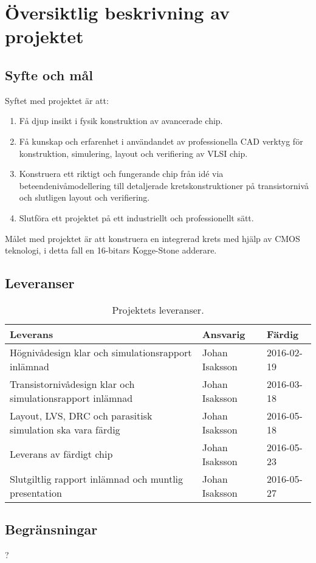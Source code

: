\section{Översiktlig beskrivning av projektet}


\subsection{Syfte och mål}
Syftet med projektet är att:
\begin{enumerate}
 \item Få djup insikt i fysik konstruktion av avancerade chip.
 \item Få kunskap och erfarenhet i användandet av professionella CAD verktyg för konstruktion, simulering, layout och verifiering av VLSI chip.
 \item Konstruera ett riktigt och fungerande chip från idé via beteendenivåmodellering till detaljerade kretskonstruktioner på transistornivå och slutligen layout och verifiering.
 \item Slutföra ett projektet på ett industriellt och professionellt sätt.
\end{enumerate}

\raggedright Målet med projektet är att konstruera en integrerad krets med hjälp av CMOS teknologi, i detta fall en 16-bitars Kogge-Stone adderare. 

\subsection{Leveranser}

\begin{table}[H]
  \centering
    \begin{tabularx}{\textwidth}{| l | l | X |}
      \hline
      \textbf{Leverans} & \textbf{Ansvarig} & \textbf{Färdig} \\
      \hline

      {Högnivådesign klar och simulationsrapport inlämnad} & {Johan Isaksson} & {2016-02-19} \\
      \hline
      {Transistornivådesign klar och simulationsrapport inlämnad} & {Johan Isaksson} & {2016-03-18} \\
      \hline
      {Layout, LVS, DRC och parasitisk simulation ska vara färdig} & {Johan Isaksson} & {2016-05-18} \\
      \hline
      {Leverans av färdigt chip} & {Johan Isaksson} & {2016-05-23} \\
      \hline
      {Slutgiltlig rapport inlämnad och muntlig presentation} & {Johan Isaksson} & {2016-05-27} \\
      \hline

    \end{tabularx}
  \caption{Projektets leveranser.} \label{dokumentation:tabell}
\end{table}



\subsection{Begränsningar}
?